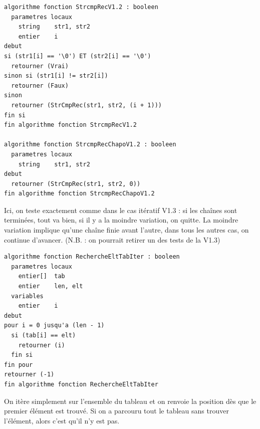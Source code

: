 \documentclass[11pt,a4paper]{article}
\begin{document}
\begin{table}[ht!]
  \centering
\begin{lstlisting}[style=algorithmique]
algorithme fonction StrcmpRecV1.2 : booleen
  parametres locaux
    string    str1, str2
    entier    i
debut
si (str1[i] == '\0') ET (str2[i] == '\0')
  retourner (Vrai)
sinon si (str1[i] != str2[i])
  retourner (Faux)
sinon
  retourner (StrCmpRec(str1, str2, (i + 1)))
fin si
fin algorithme fonction StrcmpRecV1.2

algorithme fonction StrcmpRecChapoV1.2 : booleen
  parametres locaux
    string    str1, str2
debut
  retourner (StrCmpRec(str1, str2, 0))
fin algorithme fonction StrcmpRecChapoV1.2 \end{lstlisting}
  \caption{Ici, on teste exactement comme dans le cas itératif V1.3 : si les chaînes sont terminées, tout va bien, si il y a la moindre variation, on quitte. La moindre variation implique qu'une chaîne finie avant l'autre, dans tous les autres cas, on continue d'avancer. (N.B. : on pourrait retirer un des tests de la V1.3)}
\end{table}

\bigskip


\begin{table}[ht!]
  \centering
\begin{lstlisting}[style=algorithmique]
algorithme fonction RechercheEltTabIter : booleen
  parametres locaux
    entier[]  tab
    entier    len, elt
  variables
    entier    i
debut
pour i = 0 jusqu'a (len - 1)
  si (tab[i] == elt)
    retourner (i)
  fin si
fin pour
retourner (-1)
fin algorithme fonction RechercheEltTabIter \end{lstlisting}
  \caption{On itère simplement sur l'ensemble du tableau et on renvoie la position dès que le premier élément est trouvé. Si on a parcouru tout le tableau sans trouver l'élément, alors c'est qu'il n'y est pas.}
\end{table}
\end{document}
